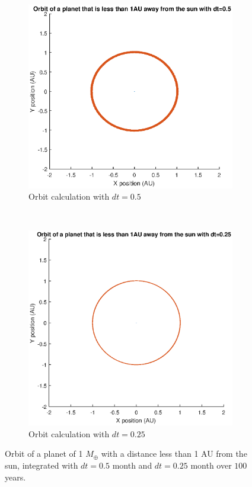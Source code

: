 \begin{figure}[H]
	\centering
	\begin{subfigure}{0.45\textwidth}
	\includegraphics[width=\textwidth]{Planeet_1AU_dt05_100jaar.eps}
	\caption{Orbit calculation with $dt=0.5$}
	\end{subfigure}
	~
	\begin{subfigure}{0.45\textwidth}
	\includegraphics[width=\textwidth]{Planeet_1AU_dt025_100jaar.eps}
	\caption{Orbit calculation with $dt=0.25$}
	\end{subfigure}
	\caption{Orbit of a planet of 1 $M_{\oplus}$ with a distance less than 1 AU from the sun, integrated with $dt=0.5$ month and $dt=0.25$ month over $100$ years.}
\end{figure} 
